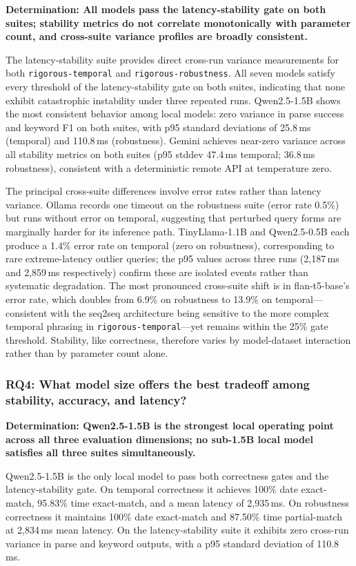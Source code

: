 \documentclass[conference]{IEEEtran}
\begin{document}
\textbf{Determination: All models pass the latency-stability gate on both suites; stability metrics do not correlate monotonically with parameter count, and cross-suite variance profiles are broadly consistent.}

The latency-stability suite provides direct cross-run variance measurements for both \texttt{rigorous-temporal} and \texttt{rigorous-robustness}. All seven models satisfy every threshold of the latency-stability gate on both suites, indicating that none exhibit catastrophic instability under three repeated runs. Qwen2.5-1.5B shows the most consistent behavior among local models: zero variance in parse success and keyword F1 on both suites, with p95 standard deviations of 25.8\,ms (temporal) and 110.8\,ms (robustness). Gemini achieves near-zero variance across all stability metrics on both suites (p95 stddev 47.4\,ms temporal; 36.8\,ms robustness), consistent with a deterministic remote API at temperature zero.

The principal cross-suite differences involve error rates rather than latency variance. Ollama records one timeout on the robustness suite (error rate 0.5\%) but runs without error on temporal, suggesting that perturbed query forms are marginally harder for its inference path. TinyLlama-1.1B and Qwen2.5-0.5B each produce a 1.4\% error rate on temporal (zero on robustness), corresponding to rare extreme-latency outlier queries; the p95 values across three runs (2,187\,ms and 2,859\,ms respectively) confirm these are isolated events rather than systematic degradation. The most pronounced cross-suite shift is in flan-t5-base's error rate, which doubles from 6.9\% on robustness to 13.9\% on temporal---consistent with the seq2seq architecture being sensitive to the more complex temporal phrasing in \texttt{rigorous-temporal}---yet remains within the 25\% gate threshold. Stability, like correctness, therefore varies by model-dataset interaction rather than by parameter count alone.

\subsubsection{RQ4: What model size offers the best tradeoff among stability, accuracy, and latency?}

\textbf{Determination: Qwen2.5-1.5B is the strongest local operating point across all three evaluation dimensions; no sub-1.5B local model satisfies all three suites simultaneously.}

Qwen2.5-1.5B is the only local model to pass both correctness gates and the latency-stability gate. On temporal correctness it achieves 100\% date exact-match, 95.83\% time exact-match, and a mean latency of 2,935\,ms. On robustness correctness it maintains 100\% date exact-match and 87.50\% time partial-match at 2,834\,ms mean latency. On the latency-stability suite it exhibits zero cross-run variance in parse and keyword outputs, with a p95 standard deviation of 110.8\,ms.
\end{document}

